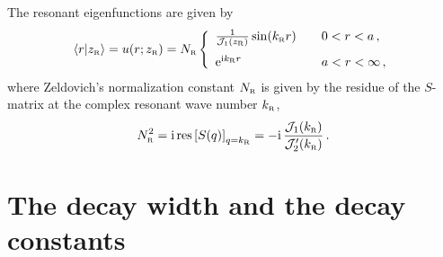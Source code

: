 \documentclass[12pt]{article}
\newcommand{\rmi}{{\rm i}}
\newcommand{\rme}{{\rm e}}
\newcommand{\zr}{z_{\text{\tiny R}}}
\newcommand{\nr}{N_{\text{\tiny R}}}
\newcommand{\kr}{k_{\text{\tiny R}}}
\begin{document}
The resonant eigenfunctions are given by
\begin{equation}
       \langle r|\zr \rangle = u(r;\zr)= \nr \left\{ \begin{array}{ll}
        \frac{1}{{\cal J}_1(\zr)} \sin (\kr r) \quad  & 0<r<a \, , \\ [2ex]
                  \rme ^{\rmi \kr r}        
     \quad &  a<r<\infty \, ,
        \end{array} 
      \right. 
	\label{rstate}
\end{equation}
where Zeldovich's normalization constant $\nr$ is given by the
residue of the $S$-matrix at the complex resonant wave number $\kr$, 
\begin{equation}
       \nr ^2= \rmi \, \text{res}\left[S(q)\right]_{q=\kr} =
              -\rmi \, \frac{{\cal J}_1(\kr)}{{\cal J}_2'(\kr)} \, .
\end{equation}














\section{The decay width and the decay constants}
\setcounter{equation}{0}
\label{sec:datdw}
\end{document}
